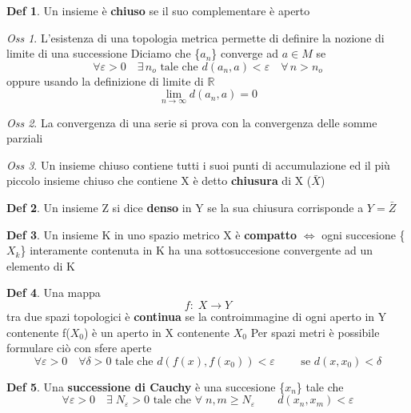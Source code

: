 \documentclass[a4paper,11pt]{report}
\theoremstyle{remark}
\newtheorem*{oss}{Oss}
\theoremstyle{definition}
\newtheorem*{Def}{Def}
\newcommand{\R}{\mathbb{R}}
\begin{document}
\begin{Def}
	Un insieme è \textbf{chiuso} se il suo complementare è aperto
\end{Def}

\begin{oss}
	L'esistenza di una topologia metrica permette di definire la nozione di limite di una successione \;
	Diciamo che \{$a_n$\} converge ad $a\in M$ se 
	\[\forall \varepsilon>0 \quad \exists \, n_o \text{ tale che } d(a_n, a)<\varepsilon \quad \forall \, n>n_o\]
	oppure usando la definizione di limite di $\R$
	\[\lim_{n\to \infty} d(a_n,a) =0\]
\end{oss}

\begin{oss}
	La convergenza di una serie si prova con la convergenza delle somme parziali
\end{oss}

\begin{oss}
	Un insieme chiuso contiene tutti i suoi punti di accumulazione ed il più piccolo insieme chiuso che contiene X è detto \textbf{chiusura} di X ($\bar{X}$)
\end{oss}

\begin{Def}
	Un insieme Z si dice \textbf{denso} in Y se la sua chiusura corrisponde a $Y = \bar{Z}$
\end{Def}

\begin{Def}
	Un insieme K in uno spazio metrico X è \textbf{compatto} $\iff$ ogni succesione \{$X_k$\} interamente contenuta in K ha una sottosuccesione convergente ad un elemento di K
\end{Def}

\begin{Def}
	Una mappa
	\[f: \; X\to Y\]
	tra due spazi topologici è \textbf{continua} se la controimmagine di ogni aperto in Y contenente f($X_0$) è un aperto in X contenente $X_0$ \newline
	Per spazi metri è possibile formulare ciò con sfere aperte
	\[\forall\varepsilon> 0 \quad \forall \delta> 0 \text{ tale che } d(f(x),f(x_0))<\varepsilon \qquad \text{ se } d(x,x_0)<\delta\]
\end{Def}

\begin{Def}
	Una \textbf{successione di Cauchy} è una succesione \{$x_n$\} tale che 
	\[\forall \varepsilon>0 \quad \exists \; N_\varepsilon >0 \text{ tale che } \forall \; n,m \ge N_\varepsilon \qquad d(x_n,x_m)< \varepsilon\]
\end{Def}
\end{document}
